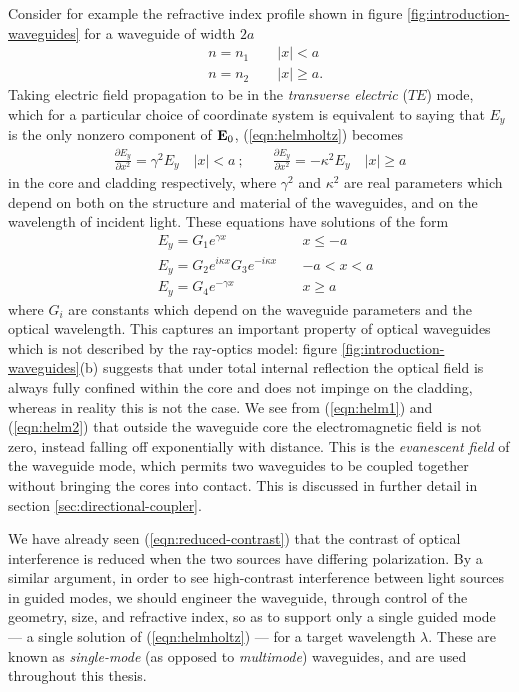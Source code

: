 Consider for example the refractive index profile shown in figure \ref{fig:introduction-waveguides} for a waveguide of width $2a$
\begin{align}
    & n = n_1 \qquad |x| < a \\
    & n = n_2 \qquad |x|\ge a.
\end{align}
Taking electric field propagation to be in the \emph{transverse electric} ($TE$) mode, which for a particular choice of coordinate system is equivalent to saying that $E_y$ is the only nonzero component of $\mathbf{E}_0$, (\ref{eqn:helmholtz}) becomes 
\begin{gather}
    \frac{\partial E_y}{\partial x^2} = \gamma^2 E_y   \quad |x|<a ~; \qquad
    \frac{\partial E_y}{\partial x^2} = - \kappa^2 E_y \quad |x|\ge a
\end{gather}
in the core and cladding respectively, where $\gamma^2$ and $\kappa^2$ are real parameters which depend on both on the structure and material of the waveguides, and on the wavelength of incident light.  These equations have solutions of the form
\begin{align}
    &E_y = G_1 e^{\gamma x} \quad &x \le -a \label{eqn:helm1}\\
    &E_y = G_2 e^{i \kappa x} G_3 e^{-i \kappa x} \quad &-a < x < a\\
    &E_y = G_4 e^{-\gamma x} \quad & x \ge a \label{eqn:helm2}
\end{align}
where $G_i$ are constants which depend on the waveguide parameters and the optical wavelength.  This captures an important property of optical waveguides which is not described by the ray-optics model: figure \ref{fig:introduction-waveguides}(b) suggests that under total internal reflection the optical field is always fully confined within the core and does not impinge on the cladding, whereas in reality this is not the case.  We see from (\ref{eqn:helm1}) and (\ref{eqn:helm2}) that outside the waveguide core the electromagnetic field is not zero, instead falling off exponentially with distance. This is the \emph{evanescent field} of the waveguide mode, which permits two waveguides to be coupled together without bringing the cores into contact. This is discussed in further detail in section \ref{sec:directional-coupler}.

We have already seen (\ref{eqn:reduced-contrast}) that the contrast of optical interference is reduced when the two sources have differing polarization. By a similar argument, in order to see high-contrast interference between light sources in guided modes, we should engineer the waveguide, through control of the geometry, size, and refractive index, so as to support only a single guided mode --- a single solution of (\ref{eqn:helmholtz}) --- for a target wavelength $\lambda$. These are known as \emph{single-mode} (as opposed to \emph{multimode}) waveguides, and are used throughout this thesis.


